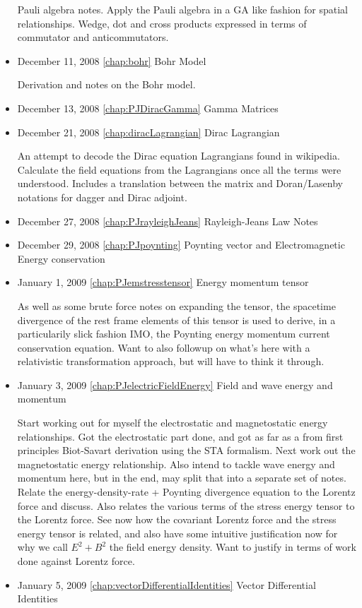 \begin{itemize}
Pauli algebra notes.  Apply the Pauli algebra in a GA like fashion for spatial relationships.  Wedge, dot and cross products expressed in terms of commutator and anticommutators.\item December 11, 2008 \ref{chap:bohr} Bohr Model

Derivation and notes on the Bohr model.\item December 13, 2008 \ref{chap:PJDiracGamma} Gamma Matrices

\item December 21, 2008 \ref{chap:diracLagrangian} Dirac Lagrangian

An attempt to decode the Dirac equation Lagrangians found in wikipedia.  Calculate the field equations from the Lagrangians once all the terms were understood.  Includes a translation between the matrix and Doran/Lasenby notations for dagger and Dirac adjoint.\item December 27, 2008 \ref{chap:PJrayleighJeans} Rayleigh-Jeans Law Notes

\item December 29, 2008 \ref{chap:PJpoynting} Poynting vector and Electromagnetic Energy conservation

\item January 1, 2009 \ref{chap:PJemstresstensor} Energy momentum tensor

As well as some brute force notes on expanding the tensor, the spacetime divergence of the rest frame elements of this tensor is used to derive, in a particularily slick fashion IMO, the Poynting energy momentum current conservation equation.  Want to also followup on what's here with a relativistic transformation approach, but will have to think it through. \item January 3, 2009 \ref{chap:PJelectricFieldEnergy} Field and wave energy and momentum

Start working out for myself the electrostatic and magnetostatic energy relationships.  Got the electrostatic part done, and got as far as a from first principles Biot-Savart derivation using the STA formalism.  Next work out the magnetostatic energy relationship.  Also intend to tackle wave energy and momentum here, but in the end, may split that into a separate set of notes.  Relate the energy-density-rate + Poynting divergence equation to the Lorentz force and discuss.  Also relates the various terms of the stress energy tensor to the Lorentz force.  See now how the covariant Lorentz force and the stress energy tensor is related, and also have some intuitive justification now for why we call $E^2 + B^2$ the field energy density.  Want to justify in terms of work done against Lorentz force. \item January 5, 2009 \ref{chap:vectorDifferentialIdentities} Vector Differential Identities


\end{itemize}
